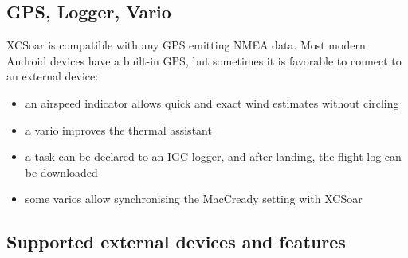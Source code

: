 \subsection*{GPS, Logger, Vario}

XCSoar is compatible with any GPS emitting NMEA data.  Most modern
Android devices have a built-in GPS, but sometimes it is favorable to
connect to an external device:

\begin{itemize}
\item an airspeed indicator allows quick and exact wind estimates
  without circling
\item a vario improves the thermal assistant
\item a task can be declared to an IGC logger, and after landing, the
  flight log can be downloaded
\item some varios allow synchronising the MacCready setting with
  XCSoar
\end{itemize}

\subsection*{Supported external devices and features}
\label{sec:supported-varios}

\newcommand{\y}[0]{{ $\surd$ }}
\noindent{}

